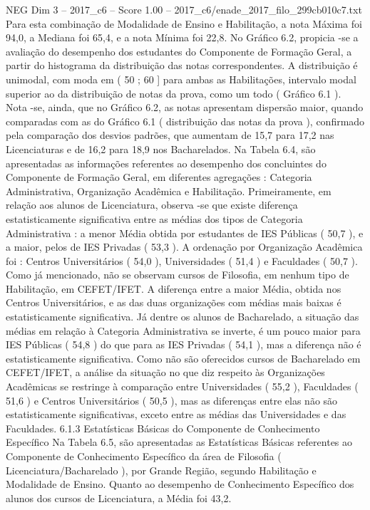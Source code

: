 \begin{textsample}{NEG Dim 3 – 2017\_c6 – Score 1.00 – 2017\_c6/enade\_2017\_filo\_299cb010c7.txt}
Para esta combinação de Modalidade de Ensino e Habilitação, a nota Máxima foi 94,0, a Mediana foi 65,4, e a nota Mínima foi 22,8.
No Gráfico 6.2, propicia -se a avaliação do desempenho dos estudantes do Componente de Formação Geral, a partir do histograma da distribuição das notas correspondentes.
A distribuição é unimodal, com moda em ( 50 ; 60 ] para ambas as Habilitações, intervalo modal superior ao da distribuição de notas da prova, como um todo ( Gráfico 6.1 ).
Nota -se, ainda, que no Gráfico 6.2, as notas apresentam dispersão maior, quando comparadas com as do Gráfico 6.1 ( distribuição das notas da prova ), confirmado pela comparação dos desvios padrões, que aumentam de 15,7 para 17,2 nas Licenciaturas e de 16,2 para 18,9 nos Bacharelados.
Na Tabela 6.4, são apresentadas as informações referentes ao desempenho dos concluintes do Componente de Formação Geral, em diferentes agregações : Categoria Administrativa, Organização Acadêmica e Habilitação.
Primeiramente, em relação aos alunos de Licenciatura, observa -se que existe diferença estatisticamente significativa entre as médias dos tipos de Categoria Administrativa : a menor Média obtida por estudantes de IES Públicas ( 50,7 ), e a maior, pelos de IES Privadas ( 53,3 ).
A ordenação por Organização Acadêmica foi : Centros Universitários ( 54,0 ), Universidades ( 51,4 ) e Faculdades ( 50,7 ).
Como já mencionado, não se observam cursos de Filosofia, em nenhum tipo de Habilitação, em CEFET/IFET.
A diferença entre a maior Média, obtida nos Centros Universitários, e as das duas organizações com médias mais baixas é estatisticamente significativa.
Já dentre os alunos de Bacharelado, a situação das médias em relação à Categoria Administrativa se inverte, é um pouco maior para IES Públicas ( 54,8 ) do que para as IES Privadas ( 54,1 ), mas a diferença não é estatisticamente significativa.
Como não são oferecidos cursos de Bacharelado em CEFET/IFET, a análise da situação no que diz respeito às Organizações Acadêmicas se restringe à comparação entre Universidades ( 55,2 ), Faculdades ( 51,6 ) e Centros Universitários ( 50,5 ), mas as diferenças entre elas não são estatisticamente significativas, exceto entre as médias das Universidades e das Faculdades. 6.1.3 Estatísticas Básicas do Componente de Conhecimento Específico Na Tabela 6.5, são apresentadas as Estatísticas Básicas referentes ao Componente de Conhecimento Específico da área de Filosofia ( Licenciatura/Bacharelado ), por Grande Região, segundo Habilitação e Modalidade de Ensino.
Quanto ao desempenho de Conhecimento Específico dos alunos dos cursos de Licenciatura, a Média foi 43,2.

\end{textsample}
